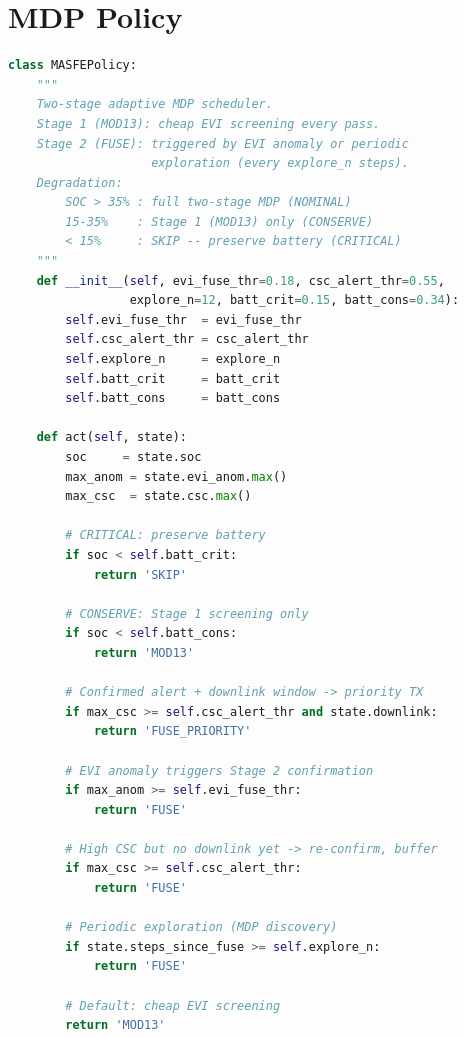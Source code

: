 \section*{MDP Policy}

\begin{lstlisting}[language=Python, caption={MASFE two-stage MDP scheduling policy. Selects action from \{SKIP, MOD13, FUSE, FUSE\_PRIORITY\} based on battery SOC, EVI anomaly score, CSC level, and downlink window availability.}]
class MASFEPolicy:
    """
    Two-stage adaptive MDP scheduler.
    Stage 1 (MOD13): cheap EVI screening every pass.
    Stage 2 (FUSE): triggered by EVI anomaly or periodic
                    exploration (every explore_n steps).
    Degradation:
        SOC > 35% : full two-stage MDP (NOMINAL)
        15-35%    : Stage 1 (MOD13) only (CONSERVE)
        < 15%     : SKIP -- preserve battery (CRITICAL)
    """
    def __init__(self, evi_fuse_thr=0.18, csc_alert_thr=0.55,
                 explore_n=12, batt_crit=0.15, batt_cons=0.34):
        self.evi_fuse_thr  = evi_fuse_thr
        self.csc_alert_thr = csc_alert_thr
        self.explore_n     = explore_n
        self.batt_crit     = batt_crit
        self.batt_cons     = batt_cons

    def act(self, state):
        soc     = state.soc
        max_anom = state.evi_anom.max()
        max_csc  = state.csc.max()

        # CRITICAL: preserve battery
        if soc < self.batt_crit:
            return 'SKIP'

        # CONSERVE: Stage 1 screening only
        if soc < self.batt_cons:
            return 'MOD13'

        # Confirmed alert + downlink window -> priority TX
        if max_csc >= self.csc_alert_thr and state.downlink:
            return 'FUSE_PRIORITY'

        # EVI anomaly triggers Stage 2 confirmation
        if max_anom >= self.evi_fuse_thr:
            return 'FUSE'

        # High CSC but no downlink yet -> re-confirm, buffer
        if max_csc >= self.csc_alert_thr:
            return 'FUSE'

        # Periodic exploration (MDP discovery)
        if state.steps_since_fuse >= self.explore_n:
            return 'FUSE'

        # Default: cheap EVI screening
        return 'MOD13'
\end{lstlisting}

